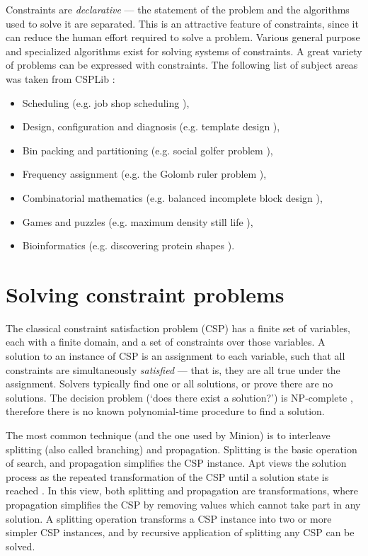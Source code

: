 \documentclass[oneside]{book}
\begin{document}
Constraints are \emph{declarative} --- the statement of the problem
and the algorithms used to solve it are separated. This is an attractive
feature of constraints, since it can reduce the human effort required
to solve a problem. Various general purpose and specialized algorithms
exist for solving systems of constraints. A great variety of problems
can be expressed with constraints. The following list of subject areas
was taken from CSPLib \cite{csplib}:

\begin{itemize}
\item Scheduling (e.g. job shop scheduling \cite{martin-jobshop-96new}),
\item Design, configuration and diagnosis (e.g. template design \cite{proll-smith-templatedesign}),
\item Bin packing and partitioning (e.g. social golfer problem \cite{harvey01symmetry}),
\item Frequency assignment (e.g. the Golomb ruler problem \cite{smith99golomb}),
\item Combinatorial mathematics (e.g. balanced incomplete block design \cite{frisch-symmetry-implied-04}),
\item Games and puzzles (e.g. maximum density still life \cite{smith-model-life}), 
\item Bioinformatics (e.g. discovering protein shapes \cite{protein-structure-problems}).
\end{itemize}

\section{Solving constraint problems}

The classical constraint satisfaction problem (CSP) has a finite set
of variables, each with a finite domain, and a set of constraints
over those variables. A solution to an instance of CSP is an assignment
to each variable, such that all constraints are simultaneously \emph{satisfied}
--- that is, they are all true under the assignment. Solvers typically
find one or all solutions, or prove there are no solutions. The decision
problem (`does there exist a solution?') is NP-complete \cite{apt-constraint-programming},
therefore there is no known polynomial-time procedure to find a solution.

The most common technique (and the one used by Minion) is to interleave
splitting (also called branching) and propagation. Splitting is the
basic operation of search, and propagation simplifies the CSP instance.
Apt views the solution process as the repeated transformation of the
CSP until a solution state is reached \cite{apt-constraint-programming}.
In this view, both splitting and propagation are transformations,
where propagation simplifies the CSP by removing values which cannot
take part in any solution. A splitting operation transforms a CSP
instance into two or more simpler CSP instances, and by recursive
application of splitting any CSP can be solved. 
\end{document}
